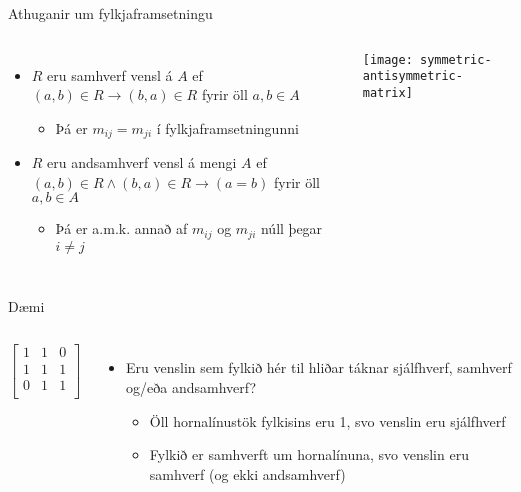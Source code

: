\documentclass[handout]{beamer}
\begin{document}
\begin{frame}{Athuganir um fylkjaframsetningu}
\begin{columns}
\begin{itemize}
 \item $R$ eru samhverf vensl á $A$ ef $(a,b) \in R \to (b, a) \in R$ fyrir öll $a, b \in A$
 \begin{itemize}
  \item Þá er $m_{ij} = m_{ji}$ í fylkjaframsetningunni
 \end{itemize}
 \item $R$ eru andsamhverf vensl á mengi $A$ ef $(a, b) \in R \land (b, a) \in R \to (a = b)$ fyrir öll $a, b \in A$
 \begin{itemize}
  \item Þá er a.m.k. annað af $m_{ij}$ og $m_{ji}$ núll þegar $i\neq j$ 
 \end{itemize}

\end{itemize}
\texttt{[image: symmetric-antisymmetric-matrix]}
\end{columns}
\end{frame}

\begin{frame}{Dæmi}
    \begin{columns}
        \[
        \begin{bmatrix}
        1&1&0\\
        1&1&1\\
        0&1&1\\
        \end{bmatrix}
        \]
        \begin{itemize}
            \item Eru venslin sem fylkið hér til hliðar táknar sjálfhverf, samhverf og/eða andsamhverf? \pause
            \begin{itemize}
                \item Öll hornalínustök fylkisins eru 1, svo venslin eru sjálfhverf
                \item Fylkið er samhverft um hornalínuna, svo venslin eru samhverf (og ekki andsamhverf)
            \end{itemize}
        \end{itemize}
    \end{columns}
\end{frame}
\end{document}
